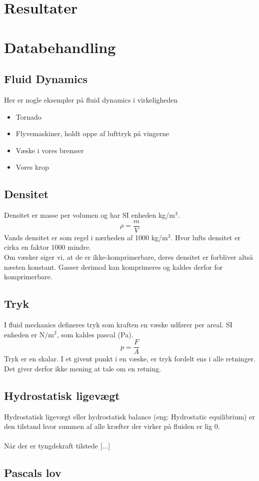 \documentclass[a4paper, 11pt]{article}
\begin{document}
\section{Resultater}
\section{Databehandling}
\subsection{Fluid Dynamics}
Her er nogle eksempler på fluid dynamics i virkeligheden
\begin{itemize}
    \item Tornado
    \item Flyvemaskiner, holdt oppe af lufttryk på vingerne
    \item Væske i vores bremser
    \item Vores krop
\end{itemize}
\subsection*{Densitet}
Densitet er masse per volumen og har SI enheden kg/\(\text{m}^3\).
\begin{equation}
    \label{densitet}
    \rho = \frac{m}{V}
\end{equation}
Vands densitet er som regel i nærheden af 1000 kg/\(\text{m}^3\). Hvor lufts densitet er cirka en faktor 1000 mindre.\\
Om væsker siger vi, at de er ikke-komprimerbare, deres densitet er forbliver altså næsten konstant. Gasser derimod kan komprimeres og kaldes derfor for komprimerbare.
\subsection*{Tryk}
I fluid mechanics defineres tryk som kraften en væske udfører per areal. SI enheden er \(\text{N}/\text{m}^2\), som kaldes pascal (Pa).
\begin{equation}
    \label{tryk}
    p=\frac{F}{A}
\end{equation}
Tryk er en skalar. I et givent punkt i en væske, er tryk fordelt ens i alle retninger. Det giver derfor ikke mening at tale om en retning. 
\subsection*{Hydrostatisk ligevægt}
Hydrostatisk ligevægt eller hydrostatisk balance (eng: Hydrostatic equilibrium) er den tilstand hvor summen af alle kræfter der virker på fluiden er lig 0.\\\\
Når der er tyngdekraft tilstede [...]
\subsection*{Pascals lov}
\end{document}
